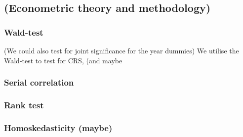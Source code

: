 \subsection{(Econometric theory and methodology)}

\subsubsection*{Wald-test}
(We could also test for joint significance for the year dummies) \newline
We utilise the Wald-test to test for CRS, (and maybe 


\subsubsection*{Serial correlation}
\subsubsection*{Rank test}
\subsubsection*{Homoskedasticity (maybe)}